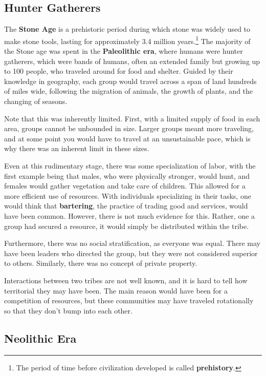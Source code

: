 \documentclass{article}
\begin{document}
  \subsection{Hunter Gatherers}

    The \textbf{Stone Age} is a prehistoric period during which stone was widely used to make stone tools, lasting for approximately 3.4 million years.\footnote{The period of time before civilization developed is called \textbf{prehistory}. } The majority of the Stone age was spent in the \textbf{Paleolithic era}, where humans were hunter gatherers, which were bands of humans, often an extended family but growing up to 100 people, who traveled around for food and shelter. Guided by their knowledge in geography, each group would travel across a span of land hundreds of miles wide, following the migration of animals, the growth of plants, and the changing of seasons. 

    Note that this was inherently limited. First, with a limited supply of food in each area, groups cannot be unbounded in size. Larger groups meant more traveling, and at some point you would have to travel at an unsustainable pace, which is why there was an inherent limit in these sizes. 

    Even at this rudimentary stage, there was some specialization of labor, with the first example being that males, who were physically stronger, would hunt, and females would gather vegetation and take care of children. This allowed for a more efficient use of resources. With individuals specializing in their tasks, one would think that \textbf{bartering}, the practice of trading good and services, would have been common. However, there is not much evidence for this. Rather, one a group had secured a resource, it would simply be distributed within the tribe. 

    Furthermore, there was no social stratification, as everyone was equal. There may have been leaders who directed the group, but they were not considered superior to others. Similarly, there was no concept of private property. 

    Interactions between two tribes are not well known, and it is hard to tell how territorial they may have been. The main reason would have been for a competition of resources, but these communities may have traveled rotationally so that they don't bump into each other. 

  \subsection{Neolithic Era}
\end{document}
